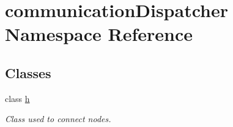\hypertarget{namespacecommunication_dispatcher}{}\section{communication\+Dispatcher Namespace Reference}
\label{namespacecommunication_dispatcher}
\subsection*{Classes}
\begin{DoxyCompactItemize}
\item 
class \hyperlink{classcommunication_dispatcher_1_1h}{h}
\begin{DoxyCompactList}\small\item\em Class used to connect nodes. \end{DoxyCompactList}\end{DoxyCompactItemize}
